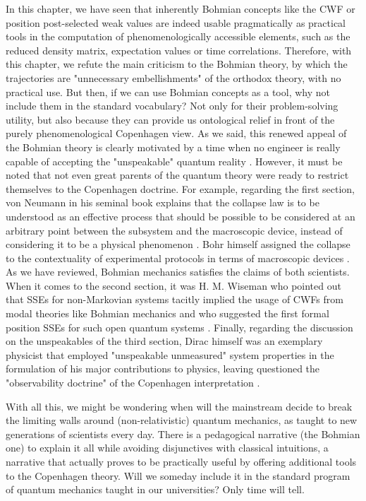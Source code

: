 \documentclass[11pt, a4paper]{article} %
\begin{document}
In this chapter, we have seen that inherently Bohmian concepts like the CWF or position post-selected weak values are indeed usable pragmatically as practical tools in the computation of phenomenologically accessible elements, such as the reduced density matrix, expectation values or time correlations. Therefore, with this chapter, we refute the main criticism to the Bohmian theory, by which the trajectories are "unnecessary embellishments" of the orthodox theory, with no practical use. But then, if we can use Bohmian concepts as a tool, why not include them in the standard vocabulary? Not only for their problem-solving utility, but also because they can provide us ontological relief in front of the purely phenomenological Copenhagen view. As we said, this renewed appeal of the Bohmian theory is clearly motivated by a time when no engineer is really capable of accepting the "unspeakable" quantum reality \cite{where, consp}. However, it must be noted that not even great parents of the quantum theory were ready to restrict themselves to the Copenhagen doctrine. For example, regarding the first section, von Neumann in his seminal book \cite{vonNeumann} explains that the collapse law is to be understood as an effective process that should be possible to be considered at an arbitrary point between the subsystem and the macroscopic device, instead of considering it to be a physical phenomenon \cite{NeumannNoCollapse}. Bohr himself assigned the collapse to the contextuality of experimental protocols in terms of macroscopic devices \cite{Dirac}. As we have reviewed, Bohmian mechanics satisfies the claims of both scientists. When it comes to the second section, it was H. M. Wiseman who pointed out that SSEs for non-Markovian systems tacitly implied the usage of CWFs from modal theories like Bohmian mechanics \cite{interpretSSE, NMisModal} and who suggested the first formal position SSEs for such open quantum systems \cite{WisemanSSE}. Finally, regarding the discussion on the unspeakables of the third section, Dirac himself was an exemplary physicist that employed "unspeakable unmeasured" system properties in the formulation of his major contributions to physics, leaving questioned the "observability doctrine" of the Copenhagen interpretation \cite{Dirac}.

With all this, we might be wondering when will the mainstream decide to break the limiting walls around (non-relativistic) quantum mechanics, as taught to new generations of scientists every day. There is a pedagogical narrative (the Bohmian one) to explain it all while avoiding disjunctives with classical intuitions, a narrative that actually proves to be practically useful by offering additional tools to the Copenhagen theory. Will we someday include it in the standard program of quantum mechanics taught in our universities? Only time will tell.
\vspace{-0.2cm}

{
%
\printbibliography
%
}
\end{document}
